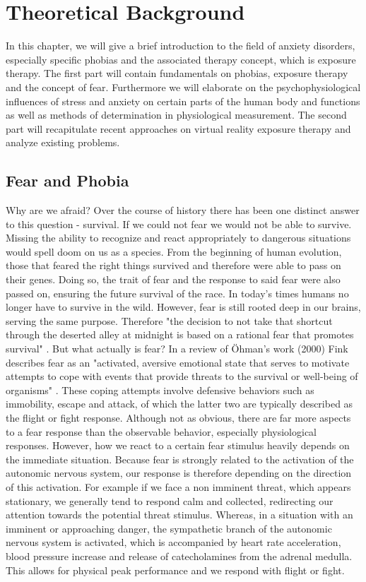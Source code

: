 
\section{Theoretical Background}
In this chapter, we will give a brief introduction to the field of anxiety disorders, especially specific phobias and the associated therapy concept, which is exposure therapy. The first part will contain fundamentals on phobias, exposure therapy and the concept of fear. Furthermore we will elaborate on the psychophysiological influences of stress and anxiety on certain parts of the human body and functions as well as methods of determination in physiological measurement. The second part will recapitulate recent approaches on virtual reality exposure therapy and analyze existing problems. 

\subsection{Fear and Phobia} 
Why are we afraid? Over the course of history there has been one distinct answer to this question - survival. If we could not fear we would not be able to survive. Missing the ability to recognize and react appropriately to dangerous situations would spell doom on us as a species. From the beginning of human evolution, those that feared the right things survived and therefore were able to pass on their genes. Doing so, the trait of fear and the response to said fear were also passed on, ensuring the future survival of the race. In today's times humans no longer have to survive in the wild. However, fear is still rooted deep in our brains, serving the same purpose. Therefore "the decision to not take that shortcut through the deserted alley at midnight is based on a rational fear that promotes survival" \cite{LAYTON2005}. But what actually is fear? In a review of Öhman's work (2000) Fink describes fear as an "activated, aversive emotional state that serves to motivate attempts to cope with events that provide threats to the survival or well-being of organisms" \cite{FINK2010}. These coping attempts involve defensive behaviors such as immobility, escape and attack, of which the latter two are typically described as the flight or fight response. Although not as obvious, there are far more aspects to a fear response than the observable behavior, especially physiological responses. However, how we react to a certain fear stimulus heavily depends on the immediate situation. Because fear is strongly related to the activation of the autonomic nervous system, our response is therefore depending on the direction of this activation. For example if we face a non imminent threat, which appears stationary, we generally tend to respond calm and collected, redirecting our attention towards the potential threat stimulus. Whereas, in a situation with an imminent or approaching danger, the sympathetic branch of the autonomic nervous system is activated, which is accompanied by heart rate acceleration, blood pressure increase and release of catecholamines from the adrenal medulla. This allows for physical peak performance and we respond with flight or fight.

